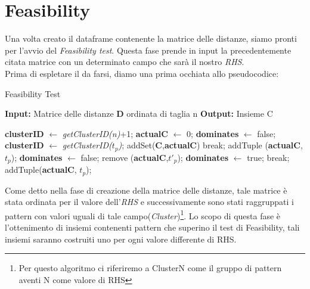 \section{Feasibility}
Una volta creato il dataframe contenente la matrice delle distanze, siamo pronti per l'avvio del \emph{Feasibility test}. Questa fase prende in input la precedentemente citata matrice con un determinato campo che sarà il nostro \emph{RHS}.\\ 
Prima di espletare il da farsi, diamo una prima occhiata allo pseudocodice:
\begin{algorithm}[H]
	\caption{Feasibility Test}
	\label{FeasibilityTestAlgoritmo}
	\textbf{Input: }Matrice delle distanze \textbf{D} ordinata di taglia n
	\newline
	\textbf{Output: }Insieme C\\
	\begin{algorithmic}[1]
		\State \textbf{clusterID} $\gets$ \emph{getClusterID(n)}+1;
		\State \textbf{actualC} $\gets$ $0$;
		\State \textbf{dominates} $\gets$ false;
		\State \textbf{clusterID} $\gets$ \emph{getClusterID($t_p$)};
		\State addSet(\textbf{C},\textbf{actualC})    
		\EndIf
		\EndIf
		\State break;   
		\EndIf
		\State addTuple (\textbf{actualC}, \emph{$t_p$});   
		\Else
		\State \textbf{dominates} $\gets$ false;
		\State remove (\textbf{actualC},$t'_p$);   
		\EndIf
		\Else
		\State \textbf{dominates} $\gets$ true;
		\State break;
		\EndIf
		\EndFor
		addTuple(\textbf{actualC}, $t_p$);
		\EndIf
		\EndIf
		\EndFor\\
	\end{algorithmic}
\end{algorithm}
Come detto nella fase di creazione della matrice delle distanze, tale matrice è stata ordinata per il valore dell'\emph{RHS} e successivamente sono stati raggruppati i pattern con valori uguali di tale campo(\emph{Cluster})\footnote{Per questo algoritmo ci riferiremo a ClusterN come il gruppo di pattern aventi N come valore di RHS }.
Lo scopo di questa fase è l'ottenimento di insiemi contenenti pattern che superino il test di Feasibility, tali insiemi saranno costruiti uno per ogni valore differente di RHS.
